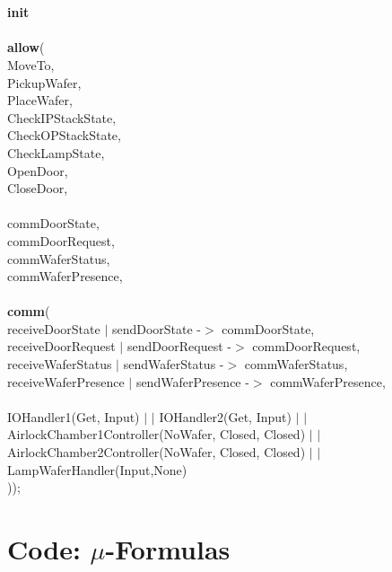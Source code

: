 \documentclass[a4paper,12pt]{article}
\begin{document}
\\
\\\textbf{init} 
\\
\\\textbf{			allow}(
\\						{MoveTo,
 \\ 				 	 PickupWafer,
 \\				 		 PlaceWafer,
 \\	    			 CheckIPStackState,
\\	  				 CheckOPStackState,
\\						 CheckLampState,
\\						 OpenDoor,
\\						 CloseDoor,
\\
\\						 commDoorState,
\\						 commDoorRequest,
\\						 commWaferStatus,
\\						 commWaferPresence},
\\
\\\textbf{			comm}(
\\						{receiveDoorState $|$ sendDoorState -$>$ commDoorState,
\\						receiveDoorRequest $|$ sendDoorRequest -$>$ commDoorRequest,
\\	  				 	receiveWaferStatus $|$ sendWaferStatus -$>$ commWaferStatus,
\\				 	   receiveWaferPresence $|$ sendWaferPresence -$>$ commWaferPresence},
\\
\\						 IOHandler1(Get, Input) $|$ $|$ IOHandler2(Get, Input) $|$ $|$ AirlockChamber1Controller(NoWafer, Closed, Closed) $|$ $|$ AirlockChamber2Controller(NoWafer, Closed, Closed) $|$ $|$ LampWaferHandler(Input,None)
\\					 ));
\newpage
\section{Code: $\mu$-Formulas}
\end{document}
